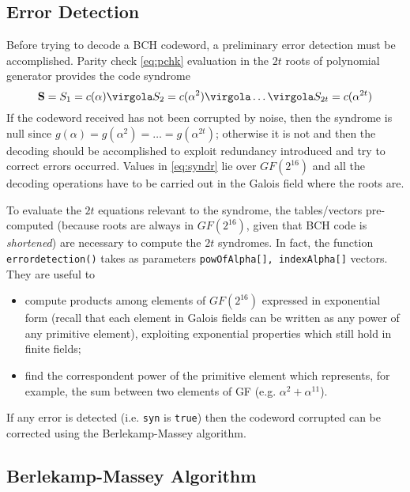 \subsection{Error Detection}
Before trying to decode a BCH codeword, a preliminary error detection must be accomplished. Parity check \eqref{eq:pchk} evaluation in the \(2t\) roots of polynomial generator provides the code syndrome
\begin{equation} \label{eq:syndr}
\vet S = S_1 = c(\alpha) \virgola S_2 = c(\alpha^2) \virgola \ldots \virgola S_{2t} = c(\alpha^{2t})
\end{equation}
If the codeword received has not been corrupted by noise, then the syndrome is null since \(g(\alpha) = g(\alpha^2) = \ldots = g(\alpha^{2t})\); otherwise it is not and then the decoding should be accomplished to exploit redundancy introduced and try to correct errors occurred. Values in \eqref{eq:syndr} lie over \(GF(2^{16})\) and all the decoding operations have to be carried out in the Galois field where the roots are.



To evaluate the \(2t\) equations relevant to the syndrome, the tables/vectors pre-computed (because roots are always in \(GF(2^{16})\), given that BCH code is \emph{shortened}) are necessary to compute the \(2t\) syndromes. In fact, the function \texttt{errordetection()} takes as parameters \texttt{powOfAlpha[], indexAlpha[]} vectors. They are useful to
\begin{itemize}
\item compute products among elements of \(GF(2^{16}) \) expressed in exponential form (recall that each element in Galois fields can be written as any power of any primitive element), exploiting exponential properties which still hold in finite fields;
\item find the correspondent power of the primitive element which represents, for example, the sum between two elements of GF (e.g. \( \alpha^2 + \alpha^{11}\)).
\end{itemize}

If any error is detected (i.e. \texttt{syn} is \texttt{true}) then the codeword corrupted can be corrected using the Berlekamp-Massey algorithm.

\subsection{Berlekamp-Massey Algorithm}

